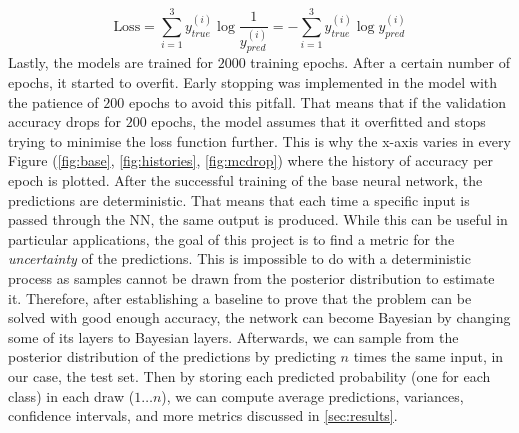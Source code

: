 \documentclass[11pt,twoside]{article}
\numberwithin{Theorem}{section}
\numberwithin{Definition}{section}
\numberwithin{Lemma}{section}
\numberwithin{Algorithm}{section}
\numberwithin{equation}{section}
\begin{document}
\begin{equation}
\text{Loss} = \sum_{i=1}^{3} y_{true}^{(i)} \log{\frac{1}{y_{pred}^{(i)}}} = -\sum_{i=1}^{3} y_{true}^{(i)} \log y_{pred}^{(i)}
\end{equation}
Lastly, the models are trained for $2000$ training epochs. After a certain number of epochs, it started to overfit. Early stopping was implemented in the model with the patience of $200$ epochs to avoid this pitfall. That means that if the validation accuracy drops for $200$ epochs, the model assumes that it overfitted and stops trying to minimise the loss function further. This is why the x-axis varies in every Figure (\autoref{fig:base}, \autoref{fig:histories}, \autoref{fig:mcdrop}) where the history of accuracy per epoch is plotted.
After the successful training of the base neural network, the predictions are deterministic. That means that each time a specific input is passed through the NN, the same output is produced. While this can be useful in particular applications, the goal of this project is to find a metric for the \textit{uncertainty} of the predictions. This is impossible to do with a deterministic process as samples cannot be drawn from the posterior distribution to estimate it. Therefore, after establishing a baseline to prove that the problem can be solved with good enough accuracy, the network can become Bayesian by changing some of its layers to Bayesian layers. Afterwards, we can sample from the posterior distribution of the predictions by predicting $n$ times the same input, in our case, the test set. Then by storing each predicted probability (one for each class) in each draw ($1 \dots n$), we can compute average predictions, variances, confidence intervals, and more metrics discussed in \autoref{sec:results}.
\end{document}
